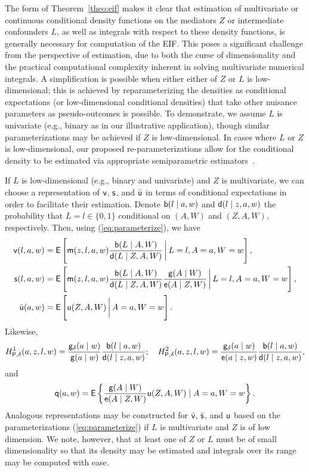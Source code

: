 The form of Theorem~\ref{theo:eif} makes it clear that estimation of
multivariate or continuous conditional density functions on the mediators $Z$ or
intermediate confounders $L$, as well as integrals with respect to these density
functions, is generally necessary for computation of the EIF. This poses
a significant challenge from the perspective of estimation, due to both the
curse of dimensionality and the practical computational complexity inherent in
solving multivariate numerical integrals. A simplification is possible when
either either of $Z$ or $L$ is low-dimensional; this is achieved by
reparameterizing the densities as conditional expectations (or low-dimensional
conditional densities) that take other nuisance parameters as pseudo-outcomes is
possible. To demonstrate, we assume $L$ is univariate (e.g., binary as in our
illustrative application), though similar parameterizations may be achieved if
$Z$ is low-dimensional. In cases where $L$ or $Z$ is low-dimensional, our
proposed re-parameterizations allow for the conditional density to be estimated
via appropriate semiparametric estimators~\citep[e.g.,][]{diaz2011super}.

\begin{lemma}\label{lemma:altres}
  If $L$ is low-dimensional (e.g., binary and univariate) and $Z$ is
  multivariate, we can choose a representation of $\mathsf{v}$, $\mathsf{s}$, and $\bar{\mathsf{u}}$ in
  terms of conditional expectations in order to facilitate their estimation.
  Denote $\mathsf{b}(l\mid a,w)$ and $\mathsf{d}(l\mid z,a,w)$ the probability that
  $L=l\in\{0,1\}$ conditional on $(A,W)$ and $(Z,A,W)$, respectively. Then,
  using (\ref{eq:parameterize}), we have
  \begin{align}
    \mathsf{v}(l,a,w) & = \mathsf{E}\left[\mathsf{m}(z,l,a,w)\frac{\mathsf{b}(L\mid A, W)}{\mathsf{d}(L\mid Z, A,
                 W)}\,\bigg|\,L=l, A=a, W=w\right],\notag\\
    \mathsf{s}(l,a,w) & =\mathsf{E}\left[\mathsf{m}(z,l,a,w)\frac{\mathsf{b}(L\mid A, W)}{\mathsf{d}(L\mid Z, A,
                W)}\frac{\mathsf{g}(A\mid W)}{\mathsf{e}(A\mid Z, W)}\,\bigg|\,L=l, A=a,
                W=w\right],\label{eq:altnuis}\\
    \bar {\mathsf{u}}(a,w) & = \mathsf{E}\left[\mathsf{u}(Z,A,W)\,\bigg|\,A=a, W=w\right].\notag
  \end{align}
  Likewise,
  \begin{equation*}
    H^1_{\mathsf{P},\delta}(a,z,l,w)  =  \frac{\mathsf{g}_\delta(a\mid
      w)}{\mathsf{g}(a\mid w)}\frac{\mathsf{b}(l\mid a, w)}{\mathsf{d}(l\mid z, a,
      w)};\quad    H^2_{\mathsf{P},\delta}(a,z,l,w)   =  \frac{\mathsf{g}_\delta(a\mid
      w)}{\mathsf{e}(a\mid z,w)}\frac{\mathsf{b}(l\mid a, w)}{\mathsf{d}(l\mid z, a,
      w)},
  \end{equation*}
  and
  $$\mathsf{q}(a, w) = \mathsf{E}\left\{\frac{\mathsf{g}(A \mid W)}{\mathsf{e}(A \mid Z, W)} \mathsf{u}(Z, A, W) \mid
  A = a, W = w \right\}.$$ Analogous representations may be constructed for
  $\bar {\mathsf{v}}$, $\bar{\mathsf{s}}$, and $\mathsf{u}$ based on the parameterizations
  (\ref{eq:parameterize}) if $L$ is multivariate and $Z$ is of low dimension. We
  note, however, that at least one of $Z$ or $L$ must be of small dimensionality
  so that its density may be estimated and integrals over its range may be
  computed with ease.
\end{lemma}

